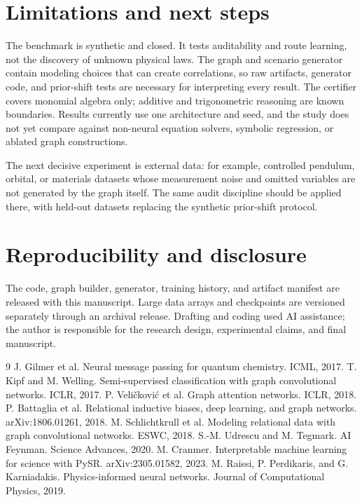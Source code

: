 \documentclass[11pt]{article}
\begin{document}
\section{Limitations and next steps}

The benchmark is synthetic and closed. It tests auditability and route learning, not the discovery of unknown physical laws. The graph and scenario generator contain modeling choices that can create correlations, so raw artifacts, generator code, and prior-shift tests are necessary for interpreting every result. The certifier covers monomial algebra only; additive and trigonometric reasoning are known boundaries. Results currently use one architecture and seed, and the study does not yet compare against non-neural equation solvers, symbolic regression, or ablated graph constructions.

The next decisive experiment is external data: for example, controlled pendulum, orbital, or materials datasets whose measurement noise and omitted variables are not generated by the graph itself. The same audit discipline should be applied there, with held-out datasets replacing the synthetic prior-shift protocol.

\section*{Reproducibility and disclosure}

The code, graph builder, generator, training history, and artifact manifest are released with this manuscript. Large data arrays and checkpoints are versioned separately through an archival release. Drafting and coding used AI assistance; the author is responsible for the research design, experimental claims, and final manuscript.

\begin{thebibliography}{9}\small
{} J. Gilmer et al. Neural message passing for quantum chemistry. ICML, 2017.
 T. Kipf and M. Welling. Semi-supervised classification with graph convolutional networks. ICLR, 2017.
 P. Veli\v{c}kovi\'c et al. Graph attention networks. ICLR, 2018.
 P. Battaglia et al. Relational inductive biases, deep learning, and graph networks. arXiv:1806.01261, 2018.
 M. Schlichtkrull et al. Modeling relational data with graph convolutional networks. ESWC, 2018.
 S.-M. Udrescu and M. Tegmark. AI Feynman. Science Advances, 2020.
 M. Cranmer. Interpretable machine learning for science with PySR. arXiv:2305.01582, 2023.
 M. Raissi, P. Perdikaris, and G. Karniadakis. Physics-informed neural networks. Journal of Computational Physics, 2019.
\end{thebibliography}
\end{document}
